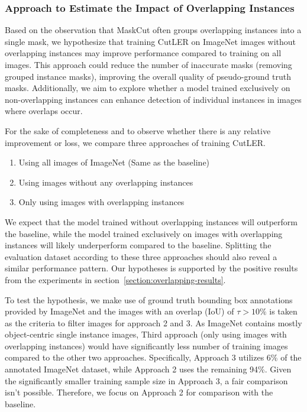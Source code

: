 \subsubsection{Approach to Estimate the Impact of Overlapping Instances}
\label{section:analysis_ol_instancs}

Based on the observation that MaskCut often groups overlapping instances into a single mask, we hypothesize that training CutLER on ImageNet images without overlapping instances may improve performance compared to training on all images. This approach could reduce the number of inaccurate masks (removing grouped instance masks), improving the overall quality of pseudo-ground truth masks. Additionally, we aim to explore whether a model trained exclusively on non-overlapping instances can enhance detection of individual instances in images where overlaps occur.

For the sake of completeness and to observe whether there is any relative improvement or loss, we compare three approaches of training CutLER. 

\begin{enumerate}
	\item Using all images of ImageNet (Same as the baseline)
	\item Using images without any overlapping instances 
	\item Only using images with overlapping instances
\end{enumerate}

We expect that the model trained without overlapping instances will outperform the baseline, while the model trained exclusively on images with overlapping instances will likely underperform compared to the baseline. Splitting the evaluation dataset according to these three approaches should also reveal a similar performance pattern. Our hypotheses is supported by the positive results from the experiments in section~\ref{section:overlapping-results}.

To test the hypothesis, we make use of ground truth bounding box annotations provided by ImageNet and the images with an overlap (IoU) of \(\tau > \text{10\%}\) is taken as the criteria to filter images for approach 2 and 3. As ImageNet contains mostly object-centric single instance images, Third approach (only using images with overlapping instances) would have significantly less number of training images compared to the other two approaches. Specifically, Approach 3 utilizes 6\% of the annotated ImageNet dataset, while Approach 2 uses the remaining 94\%. Given the significantly smaller training sample size in Approach 3, a fair comparison isn't possible. Therefore, we focus on Approach 2 for comparison with the baseline.

